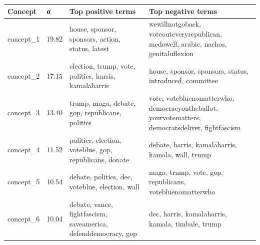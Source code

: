 \begin{tabular}{llll}
\toprule
Concept & σ & Top positive terms & Top negative terms \\
\midrule
concept\_1 & 19.82 & house, sponsor, sponsors, action, status, latest & wewillnotgoback, voteouteveryrepublican, mcdowell, arabic, nachos, genitaluflexion \\
concept\_2 & 17.15 & election, trump, vote, politics, harris, kamalaharris & house, sponsor, sponsors, status, introduced, committee \\
concept\_3 & 13.40 & trump, maga, debate, gop, republicans, politics & vote, votebluenomatterwho, democracyontheballot, yourvotematters, democratsdeliver, fightfascism \\
concept\_4 & 11.52 & politics, election, voteblue, gop, republicans, donate & debate, harris, kamalaharris, kamala, wall, trump \\
concept\_5 & 10.54 & debate, politics, dec, voteblue, election, wall & maga, trump, vote, gop, republicans, votebluenomatterwho \\
concept\_6 & 10.04 & debate, vance, fightfascism, saveamerica, defenddemocracy, gop & dec, harris, kamalaharris, kamala, timbale, trump \\
\bottomrule
\end{tabular}
